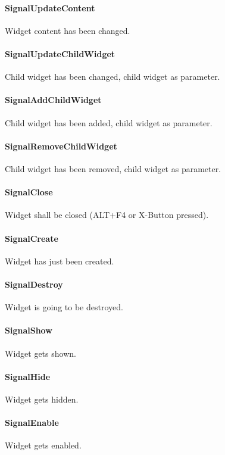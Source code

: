 \paragraph{SignalUpdateContent}
Widget content has been changed.

\paragraph{SignalUpdateChildWidget}
Child widget has been changed, child widget as parameter.

\paragraph{SignalAddChildWidget}
Child widget has been added, child widget as parameter.

\paragraph{SignalRemoveChildWidget}
Child widget has been removed, child widget as parameter.

\paragraph{SignalClose}
Widget shall be closed (ALT+F4 or X-Button pressed).

\paragraph{SignalCreate}
Widget has just been created.

\paragraph{SignalDestroy}
Widget is going to be destroyed.

\paragraph{SignalShow}
Widget gets shown.

\paragraph{SignalHide}
Widget gets hidden.

\paragraph{SignalEnable}
Widget gets enabled.

